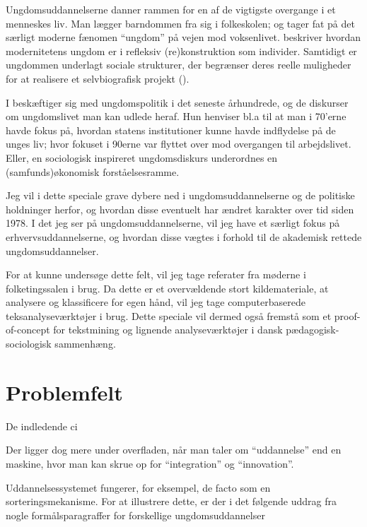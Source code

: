  Ungdomsuddannelserne danner rammen for en af de vigtigste overgange i et menneskes liv.
 Man lægger barndommen fra sig i folkeskolen; og tager fat på det særligt moderne fænomen “ungdom” på vejen mod voksenlivet.
 \citeauthor{juulDiskurserOmUngdom2013} beskriver hvordan modernitetens ungdom er i refleksiv (re)konstruktion som individer.
 Samtidigt er ungdommen underlagt sociale strukturer, der begrænser deres reelle muligheder for at realisere et selvbiografisk projekt (\citeyear[s. 11]{juulDiskurserOmUngdom2013}).

I  beskæftiger \citeauthor{juulDiskurserOmUngdom2013} sig med ungdomspolitik i det seneste århundrede, og de diskurser om ungdomslivet man kan udlede heraf.
Hun henviser bl.a til at man i 70'erne havde fokus på, hvordan statens institutioner kunne havde indflydelse på de unges liv; hvor fokuset i 90erne var flyttet over mod overgangen til arbejdslivet.
Eller, en sociologisk inspireret ungdomsdiskurs underordnes en (samfunds)økonomisk forståelsesramme.

Jeg vil i dette speciale grave dybere ned i ungdomsuddannelserne og de politiske holdninger herfor, og hvordan disse eventuelt har ændret karakter over tid siden 1978.
I det jeg ser på ungdomsuddannelserne, vil jeg have et særligt fokus på erhvervsuddannelserne, og hvordan disse vægtes i forhold til de akademisk rettede ungdomsuddannelser.

For at kunne undersøge dette felt, vil jeg tage referater fra møderne i folketingssalen i brug.
Da dette er et overvældende stort kildemateriale, at analysere og klassificere for egen hånd, vil jeg tage computerbaserede teksanalyseværktøjer i brug.
Dette speciale vil dermed også fremstå som et proof-of-concept for tekstmining og lignende analyseværktøjer i dansk pædagogisk-sociologisk sammenhæng.

\chapter{Problemfelt}\label{sec:problem}
De indledende ci

Der ligger dog mere under overfladen, når man taler om “uddannelse” end en maskine, hvor man kan skrue op for “integration” og “innovation”.

Uddannelsessystemet fungerer, for eksempel, de facto som en sorteringsmekanisme.
For at illustrere dette, er der i det følgende uddrag fra nogle formålsparagraffer for forskellige ungdomsuddannelser 

